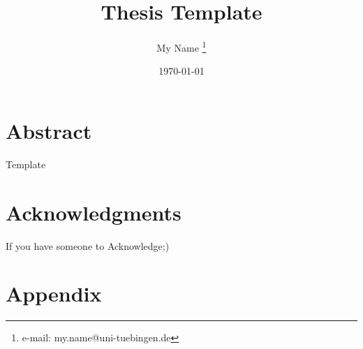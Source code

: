 \documentclass[a4paper,cleardoubleempty,BCOR1cm]{scrbook}
\title{Thesis Template}
\author{My Name \thanks{e-mail: my.name@uni-tuebingen.de}}
\date{\today}
\begin{document}


\chapter*{Abstract}
Template

\chapter*{Acknowledgments}
If you have someone to Acknowledge;)


\tableofcontents


















\appendix
\chapter{Appendix}

%

\end{document}
